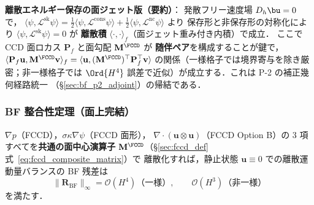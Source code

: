 \smallskip\noindent\textbf{離散エネルギー保存の面ジェット版（要約）}：
発散フリー速度場 $D_h\bu=0$ で，
$\langle\psi,\mathcal{L}^\text{sk}\psi\rangle = \tfrac{1}{2}\langle\psi,\mathcal{L}^\text{cons}\psi\rangle
+ \tfrac{1}{2}\langle\psi,\mathcal{L}^\text{nc}\psi\rangle$ より
保存形と非保存形の対称化により $\langle\psi,\mathcal{L}^\text{sk}\psi\rangle=0$
が \textbf{離散積} $\langle\cdot,\cdot\rangle_{f}$（面ジェット重み付き内積）で成立．
ここで CCD 面ロカス $\mathbf{P}_f$ と面勾配 $\mathbf{M}^{\FCCD}$ が
\textbf{随伴ペア}を構成することが鍵で，
$\langle\mathbf{P}_f\mathbf{u},\mathbf{M}^{\FCCD}\mathbf{v}\rangle_f
=\langle\mathbf{u},(\mathbf{M}^{\FCCD})^\top\mathbf{P}_f^\top\mathbf{v}\rangle$
の関係（一様格子では境界寄与を除き厳密；非一様格子では $\Ord{H^4}$
誤差で近似）が成立する．これは P-2 の補正幾何経路統一
（§\ref{sec:bf_p2_adjoint}）の帰結である．

\subsubsection{BF 整合性定理（面上完結）}
\label{sec:fccd_adv_bf_theorem}

\begin{theorem}\label{thm:fccd_adv_bf}
$\nabla p$（FCCD），$\sigma\kappa\nabla\psi$（FCCD 面形），
$\nabla\cdot(\mathbf{u}\otimes\mathbf{u})$（FCCD Option B）の
3 項すべてを\textbf{共通の面中心演算子}
$\mathbf{M}^{\FCCD}$（\S\ref{sec:fccd_def} 式~\eqref{eq:fccd_composite_matrix}）で
離散化すれば，静止状態 $\mathbf{u}\equiv 0$ での離散運動量バランスの
BF 残差は
\begin{equation*}
  \|\mathbf{R}_\text{BF}\|_\infty = \mathcal{O}(H^4)\text{（一様）},
  \qquad \mathcal{O}(H^3)\text{（非一様）}
\end{equation*}
を満たす．
\end{theorem}

